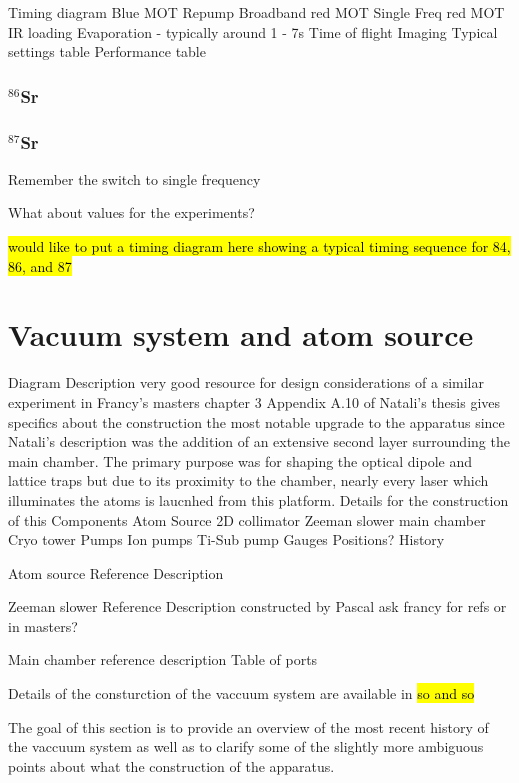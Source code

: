 Timing diagram
	Blue MOT
	Repump
	Broadband red MOT
	Single Freq red MOT
	IR loading
	Evaporation - typically around 1 - 7s
	Time of flight
	Imaging
Typical settings table
Performance table

\subsubsection{$^{86}$Sr} \label{sec:86_trapping}

\subsubsection{$^{87}$Sr} \label{sec:87_trapping}


Remember the switch to single frequency

What about values for the experiments?

\hl{would like to put a timing diagram here showing a typical timing sequence for 84, 86, and 87}



\section{Vacuum system and atom source}
\label{sec:vac}

Diagram
Description
	very good resource for design considerations of a similar experiment in Francy's masters chapter 3
	Appendix A.10 of Natali's thesis gives specifics about the construction
		the most notable upgrade to the apparatus since Natali's description was the addition of an extensive second layer surrounding the main chamber. The primary purpose was for shaping the optical dipole and lattice traps but due to its proximity to the chamber, nearly every laser which illuminates the atoms is laucnhed from this platform. Details for the construction of this 
Components
	Atom Source
	2D collimator
	Zeeman slower
	main chamber
	Cryo tower
	Pumps
		Ion pumps
		Ti-Sub pump
	Gauges
		Positions?
History
	
Atom source
	Reference
	Description
	
	
Zeeman slower
	Reference
	Description
		constructed by Pascal
		ask francy for refs or in masters?
		
Main chamber
	reference
	description
	Table of ports
	
	


Details of the consturction of the vaccuum system are available in \hl{so and so}

The goal of this section is to provide an overview of the most recent history of the vaccuum system as well as to clarify some of the slightly more ambiguous points about what the construction of the apparatus.

